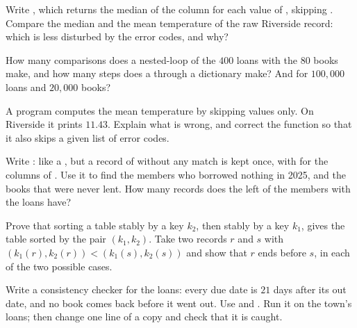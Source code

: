 \begin{exercise}[$\star\star$]\label{exo:g10:data-tables:9}
Write , which returns the median of the column  for each value of
, skipping . Compare the median and the mean temperature of the raw Riverside record: which
is less disturbed by the error codes, and why?
\end{exercise}

\begin{exercise}[$\star\star$]\label{exo:g10:data-tables:10}
How many comparisons does a nested-loop  of the $400$ loans with the $80$ books make, and how many steps does a
 through a dictionary make? And for $100{,}000$ loans and $20{,}000$ books?
\end{exercise}

\begin{exercise}[$\star\star$]\label{exo:g10:data-tables:11}
A program computes the mean temperature by skipping  values only. On Riverside it prints $11.43$. Explain
what is wrong, and correct the function so that it also skips a given list of error codes.
\end{exercise}

\begin{exercise}[$\star\star\star$]\label{exo:g10:data-tables:12}
Write : like a , but a record of  without any match is kept once,
with  for the columns of . Use it to find the members who borrowed nothing in 2025, and the
books that were never lent. How many records does the left  of the members with the loans have?
\end{exercise}

\begin{exercise}[$\star\star\star$]\label{exo:g10:data-tables:13}
Prove that sorting a table stably by a key $k_2$, then stably by a key $k_1$, gives the table sorted by the pair
$(k_1, k_2)$. Take two records $r$ and $s$ with $(k_1(r), k_2(r)) < (k_1(s), k_2(s))$ and show that $r$ ends before
$s$, in each of the two possible cases.
\end{exercise}

\begin{exercise}[$\star\star\star$]\label{exo:g10:data-tables:14}
Write a consistency checker for the loans: every due date is $21$ days after its out date, and no book comes back
before it went out. Use  and . Run it on the town's loans; then
change one line of a copy and check that it is caught.
\end{exercise}

